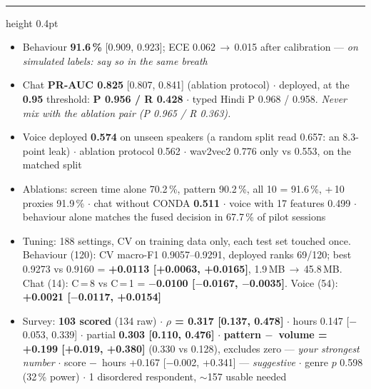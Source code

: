 \documentclass[10pt,a4paper]{article}
\newcommand{\sect}[1]{\vspace{2mm}{\color{teal}\bfseries\small\MakeUppercase{#1}}\\[0.6mm]\hrule height 0.4pt\vspace{1.2mm}}
\newcommand{\mn}{\ensuremath{-}}
\begin{document}
\sect{Numbers cold}
\begin{itemize}[leftmargin=4mm,itemsep=0.3mm,topsep=0mm]\small
\item Behaviour \textbf{91.6\,\%} [0.909, 0.923]; ECE 0.062\,$\to$\,0.015 after calibration --- \emph{on simulated labels: say so in the same breath}
\item Chat \textbf{PR-AUC 0.825} [0.807, 0.841] (ablation protocol) $\cdot$ deployed, at the \textbf{0.95} threshold: \textbf{P 0.956 / R 0.428} $\cdot$ typed Hindi P 0.968 / 0.958. \emph{Never mix with the ablation pair (P 0.965 / R 0.363).}
\item Voice deployed \textbf{0.574} on unseen speakers (a random split read 0.657: an 8.3-point leak) $\cdot$ ablation protocol 0.562 $\cdot$ wav2vec2 0.776 only vs 0.553, on the matched split
\item Ablations: screen time alone 70.2\,\%, pattern 90.2\,\%, all 10 = 91.6\,\%, +\,10 proxies 91.9\,\% $\cdot$ chat without CONDA \textbf{0.511} $\cdot$ voice with 17 features 0.499 $\cdot$ behaviour alone matches the fused decision in 67.7\,\% of pilot sessions
\item Tuning: 188 settings, CV on training data only, each test set touched once. Behaviour (120): CV macro-F1 0.9057--0.9291, deployed ranks 69/120; best 0.9273 vs 0.9160 = \textbf{+0.0113 [+0.0063, +0.0165]}, 1.9\,MB\,$\to$\,45.8\,MB. Chat (14): C\,=\,8 vs C\,=\,1 = \textbf{\mn0.0100 [\mn0.0167, \mn0.0035]}. Voice (54): \textbf{+0.0021 [\mn0.0117, +0.0154]}
\item Survey: \textbf{103 scored} (134 raw) $\cdot$ \textbf{$\rho$ = 0.317 [0.137, 0.478]} $\cdot$ hours 0.147 [\mn0.053, 0.339] $\cdot$ partial \textbf{0.303 [0.110, 0.476]} $\cdot$ \textbf{pattern \mn\ volume = +0.199 [+0.019, +0.380]} (0.330 vs 0.128), excludes zero --- \emph{your strongest number} $\cdot$ score \mn\ hours +0.167 [\mn0.002, +0.341] --- \emph{suggestive} $\cdot$ genre $p$ 0.598 (32\,\% power) $\cdot$ 1 disordered respondent, $\sim$157 usable needed
\end{itemize}
\end{document}
